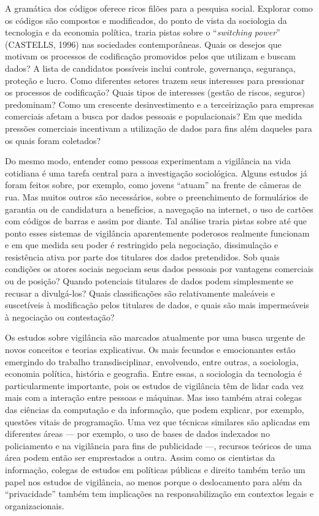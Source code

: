A gramática dos códigos oferece ricos filões para a pesquisa social.
Explorar como os códigos são compostos e modificados, do ponto de vista
da sociologia da tecnologia e da economia política, traria pistas sobre
o ``\emph{switching power}'' (CASTELLS, 1996) nas sociedades
contemporâneas. Quais os desejos que motivam os processos de codificação
promovidos pelos que utilizam e buscam dados? A lista de candidatos
possíveis inclui controle, governança, segurança, proteção e lucro. Como
diferentes setores trazem seus interesses para pressionar os processos
de codificação? Quais tipos de interesses (gestão de riscos, seguros)
predominam? Como um crescente desinvestimento e a terceirização para
empresas comerciais afetam a busca por dados pessoais e populacionais?
Em que medida pressões comerciais incentivam a utilização de dados para
fins além daqueles para os quais foram coletados?

Do mesmo modo, entender como pessoas experimentam a vigilância na vida
cotidiana é uma tarefa central para a investigação sociológica. Alguns
estudos já foram feitos sobre, por exemplo, como jovens ``atuam'' na
frente de câmeras de rua. Mas muitos outros são necessários, sobre o
preenchimento de formulários de garantia ou de candidatura a benefícios,
a navegação na internet, o uso de cartões com códigos de barras e assim
por diante. Tal análise traria pistas sobre até que ponto esses sistemas
de vigilância aparentemente poderosos realmente funcionam e em que
medida seu poder é restringido pela negociação, dissimulação e
resistência ativa por parte dos titulares dos dados pretendidos. Sob
quais condições os atores sociais negociam seus dados pessoais por
vantagens comerciais ou de posição? Quando potenciais titulares de dados
podem simplesmente se recusar a divulgá-los? Quais classificações são
relativamente maleáveis e suscetíveis à modificação pelos titulares de
dados, e quais são mais impermeáveis à negociação ou contestação?

Os estudos sobre vigilância são marcados atualmente por uma busca
urgente de novos conceitos e teorias explicativas. Os mais fecundos e
emocionantes estão emergindo do trabalho transdisciplinar, envolvendo,
entre outras, a sociologia, economia política, história e geografia.
Entre essas, a sociologia da tecnologia é particularmente importante,
pois os estudos de vigilância têm de lidar cada vez mais com a interação
entre pessoas e máquinas. Mas isso também atrai colegas das ciências da
computação e da informação, que podem explicar, por exemplo, questões
vitais de programação. Uma vez que técnicas similares são aplicadas em
diferentes áreas --- por exemplo, o uso de bases de dados indexados no
policiamento e na vigilância para fins de publicidade ---, recursos
teóricos de uma área podem então ser emprestados a outra. Assim como os
cientistas da informação, colegas de estudos em políticas públicas e
direito também terão um papel nos estudos de vigilância, ao menos porque
o deslocamento para além da ``privacidade'' também tem implicações na
responsabilização em contextos legais e organizacionais.

